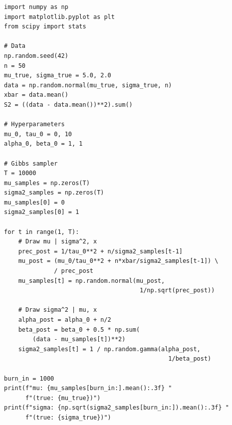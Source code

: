 \begin{codeblock}[title=\textbf{Gibbs sampler for the normal model}]
\begin{verbatim}
import numpy as np
import matplotlib.pyplot as plt
from scipy import stats

# Data
np.random.seed(42)
n = 50
mu_true, sigma_true = 5.0, 2.0
data = np.random.normal(mu_true, sigma_true, n)
xbar = data.mean()
S2 = ((data - data.mean())**2).sum()

# Hyperparameters
mu_0, tau_0 = 0, 10
alpha_0, beta_0 = 1, 1

# Gibbs sampler
T = 10000
mu_samples = np.zeros(T)
sigma2_samples = np.zeros(T)
mu_samples[0] = 0
sigma2_samples[0] = 1

for t in range(1, T):
    # Draw mu | sigma^2, x
    prec_post = 1/tau_0**2 + n/sigma2_samples[t-1]
    mu_post = (mu_0/tau_0**2 + n*xbar/sigma2_samples[t-1]) \
              / prec_post
    mu_samples[t] = np.random.normal(mu_post,
                                      1/np.sqrt(prec_post))

    # Draw sigma^2 | mu, x
    alpha_post = alpha_0 + n/2
    beta_post = beta_0 + 0.5 * np.sum(
        (data - mu_samples[t])**2)
    sigma2_samples[t] = 1 / np.random.gamma(alpha_post,
                                              1/beta_post)

burn_in = 1000
print(f"mu: {mu_samples[burn_in:].mean():.3f} "
      f"(true: {mu_true})")
print(f"sigma: {np.sqrt(sigma2_samples[burn_in:]).mean():.3f} "
      f"(true: {sigma_true})")
\end{verbatim}
\end{codeblock}

